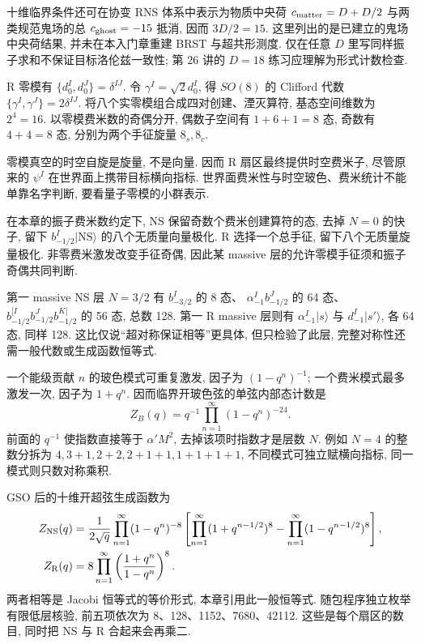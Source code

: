 十维临界条件还可在协变 RNS 体系中表示为物质中央荷 $c_{\rm matter}=D+D/2$ 与两类规范鬼场的总 $c_{\rm ghost}=-15$ 抵消, 因而 $3D/2=15$. 这里列出的是已建立的鬼场中央荷结果, 并未在本入门章重建 BRST 与超共形测度. 仅在任意 $D$ 里写同样振子求和不保证目标洛伦兹一致性; 第 26 讲的 $D=18$ 练习应理解为形式计数检查.

R 零模有 $\{d_0^I,d_0^J\}=\delta^{IJ}$. 令 $\gamma^I=\sqrt2d_0^I$, 得 $SO(8)$ 的 Clifford 代数 $\{\gamma^I,\gamma^J\}=2\delta^{IJ}$. 将八个实零模组合成四对创建、湮灭算符, 基态空间维数为 $2^4=16$. 以零模费米数的奇偶分开, 偶数子空间有 $1+6+1=8$ 态, 奇数有 $4+4=8$ 态, 分别为两个手征旋量 $8_s,8_c$.

零模真空的时空自旋是旋量, 不是向量. 因而 R 扇区最终提供时空费米子, 尽管原来的 $\psi^I$ 在世界面上携带目标横向指标. 世界面费米性与时空玻色、费米统计不能单靠名字判断, 要看量子零模的小群表示.

在本章的振子费米数约定下, NS 保留奇数个费米创建算符的态, 去掉 $N=0$ 的快子, 留下 $b_{-1/2}^I|\mathrm{NS}\rangle$ 的八个无质量向量极化. R 选择一个总手征, 留下八个无质量旋量极化. 非零费米激发改变手征奇偶, 因此某 massive 层的允许零模手征须和振子奇偶共同判断.

第一 massive NS 层 $N=3/2$ 有 $b_{-3/2}^I$ 的 8 态、
$\alpha_{-1}^Ib_{-1/2}^J$ 的 64 态、$b_{-1/2}^{[I}b_{-1/2}^Jb_{-1/2}^{K]}$ 的 56 态, 总数 128. 第一 R massive 层则有 $\alpha_{-1}^I|s\rangle$ 与 $d_{-1}^I|s'\rangle$, 各 64 态, 同样 128. 这比仅说“超对称保证相等”更具体, 但只检验了此层, 完整对称性还需一般代数或生成函数恒等式.

一个能级贡献 $n$ 的玻色模式可重复激发, 因子为 $(1-q^n)^{-1}$; 一个费米模式最多激发一次, 因子为 $1+q^n$. 因而临界开玻色弦的单弦内部态计数是
\[
 Z_B(q)=q^{-1}\prod_{n=1}^\infty(1-q^n)^{-24}.
\]
前面的 $q^{-1}$ 使指数直接等于 $\alpha'M^2$, 去掉该项时指数才是层数 $N$. 例如 $N=4$ 的整数分拆为 $4,3+1,2+2,2+1+1,1+1+1+1$, 不同模式可独立赋横向指标, 同一模式则只数对称乘积.

GSO 后的十维开超弦生成函数为
\begin{align*}
 Z_{\rm NS}(q)&=\frac1{2\sqrt q}\prod_{n=1}^\infty(1-q^n)^{-8}
 \left[\prod_{n=1}^\infty(1+q^{n-1/2})^8
 -\prod_{n=1}^\infty(1-q^{n-1/2})^8\right],\\
 Z_{\rm R}(q)&=8\prod_{n=1}^\infty\left(\frac{1+q^n}{1-q^n}\right)^8.
\end{align*}
两者相等是 Jacobi 恒等式的等价形式, 本章引用此一般恒等式. 随包程序独立枚举有限低层核验, 前五项依次为 8、128、1152、7680、42112. 这些是每个扇区的数目, 同时把 NS 与 R 合起来会再乘二.

